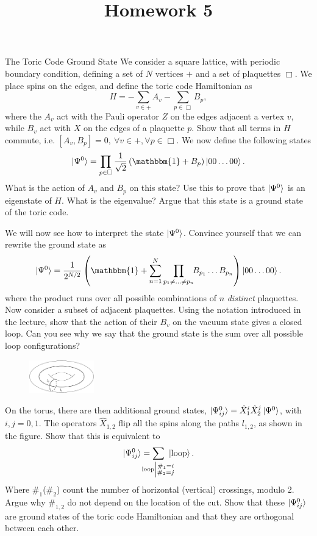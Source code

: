 \documentclass[a4paper,10pt,twoside]{article}
\def \id {{\mathbbm{1}}}
\theoremstyle{modern}
\begin{document}
\title{\vspace{-1cm}\sffamily Homework 5\vspace{-1cm}}
\author{}
\date{}
\maketitle
\thispagestyle{fancy}

\begin{section}{The Toric Code Ground State}
We consider a square lattice, with periodic boundary condition, defining a set of $N$ vertices $+$ and a set of plaquettes $\Box$.
We place spins on the edges, and define the toric code Hamiltonian as
\[
  H = -\sum_{v \in +} A_v - \sum_{p \in \Box} B_p ,
\]
where the $A_v$ act with the Pauli operator $Z$ on the edges adjacent a vertex $v$, while $B_v$ act with $X$ on the edges of a plaquette $p$.
Show that all terms in $H$ commute, i.e. $[A_v,B_p] = 0,\ \forall v \in + , \forall p \in \Box$.
We now define the following states
\[
  \ket{\Psi^0} = \prod_{p \in \Box} \frac{1}{\sqrt{2}} \left(\id + B_p\right) \ket{0 0 \dots 0 0}.
\]
What is the action of $A_v$ and $B_p$ on this state? 
Use this to prove  that $\ket{\Psi^0}$ is an eigenstate of $H$.
What is the eigenvalue?
Argue that this state is a ground state of the toric code.

We will now see how to interpret the state $\ket{\Psi^0}$.
Convince yourself that we can rewrite the ground state as
\[
   \ket{\Psi^0} = \frac{1}{2^{N/2}}\left( \id + \sum_{n=1}^N \prod_{p_1 \neq \dots \neq p_n} \!\! B_{p_1}\dots B_{p_n}\right) \ket{0 0 \dots 0 0} .
\]
where the product runs over all possible combinations of $n$ \emph{distinct} plaquettes.
Now consider a subset of adjacent plaquettes. 
Using the notation introduced in the lecture, show that the action of their $B_v$ on the vacuum state gives a closed loop.
Can you see why we say that the ground state is the sum over all possible loop configurations?

\begin{figure}
\includegraphics[width=0.25\textwidth]{img/torus-loops}
\end{figure}

On the torus, there are then additional ground states, $ \ket{\Psi_{ij}^0} = \hat{X}_{\rm 1}^i \hat{X}_{\rm 2}^j \ket{\Psi^0}$, with $ i,j = 0,1$.
The operators $\hat{X}_{1,2}$ flip all the spins along the paths $l_{1,2}$, as shown in the figure.
Show that this is equivalent to
\[
  \ket{\Psi_{ij}^0} = \sum_{\mathclap{{\rm loop} \left| \substack{\#_1 = i \\ \#_2 = j } \right. }}  \ \ket{\rm loop} .
\]
Where $\#_1$($ \#_2$) count the number of horizontal (vertical) crossings, modulo 2.
Argue why $\#_{1,2}$ do not depend on the location of the cut.
Show that these $\ket{\Psi^0_{ij}}$ are  ground states of the toric code Hamiltonian and that they are orthogonal between each other.
\end{section}
\end{document}
